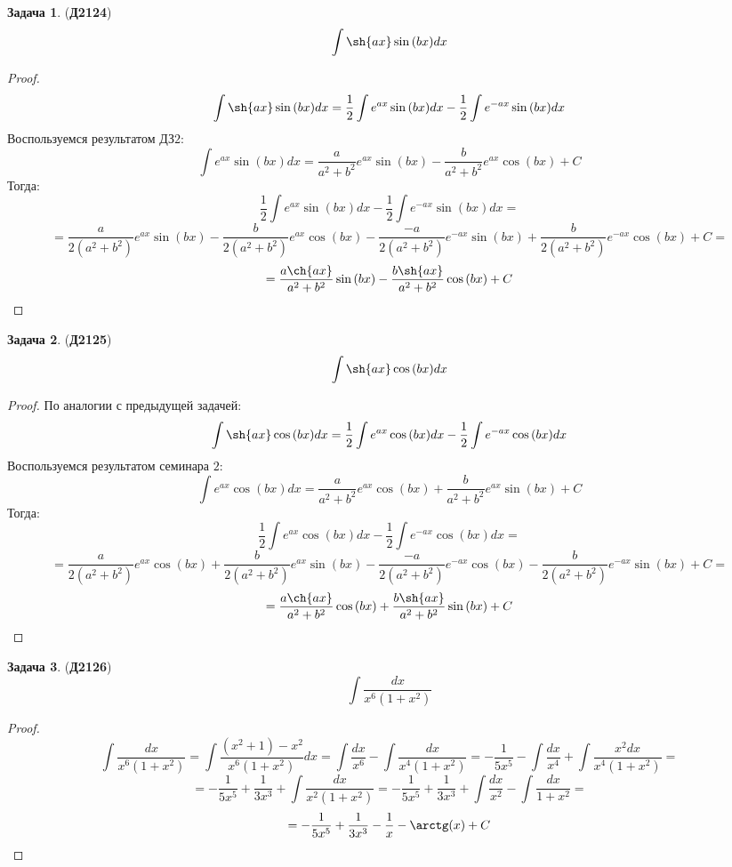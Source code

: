 \documentclass[12pt]{article}
\theoremstyle{definition}
\newtheorem{problem}{Задача}
\DeclareMathOperator{\dint}{\displaystyle\int}
\begin{document}
\begin{problem}(\textbf{Д2124})
	$$
		\dint \sh{ax}\sin{(bx)}dx
	$$
\end{problem}
\begin{proof}
	$$
		\dint \sh{ax}\sin{(bx)}dx = \dfrac{1}{2}\dint e^{ax}\sin{(bx)}dx - \dfrac{1}{2}\dint e^{-ax}\sin{(bx)}dx 
	$$
	Воспользуемся результатом ДЗ$2$:
	$$
		\dint e^{a x}\sin{(bx)}dx = \dfrac{a}{a^2 + b^2}e^{a x}\sin{(bx)} - \dfrac{b}{a^2 + b^2}e^{a x}\cos{(bx)} + C
	$$
	Тогда:
	$$
		\dfrac{1}{2}\dint e^{ax}\sin{(bx)}dx - \dfrac{1}{2}\dint e^{-ax}\sin{(bx)}dx  = 
	$$
	$$	
		= \dfrac{a}{2(a^2 + b^2)}e^{a x}\sin{(bx)} - \dfrac{b}{2(a^2 + b^2)}e^{a x}\cos{(bx)} - \dfrac{-a}{2(a^2 + b^2)}e^{-a x}\sin{(bx)} + \dfrac{b}{2(a^2 + b^2)}e^{-a x}\cos{(bx)} + C =
	$$
	$$
		=\dfrac{a\ch{ax}}{a^2 + b^2}\sin{(bx)} - \dfrac{b\sh{ax}}{a^2 + b^2}\cos{(bx)} + C
	$$
\end{proof}
\newpage
\begin{problem}(\textbf{Д2125})
	$$
		\dint \sh{ax}\cos{(bx)}dx
	$$
\end{problem}
\begin{proof}
	По аналогии с предыдущей задачей:
	$$
		\dint \sh{ax}\cos{(bx)}dx = \dfrac{1}{2}\dint e^{ax}\cos{(bx)}dx - \dfrac{1}{2}\dint e^{-ax}\cos{(bx)}dx 
	$$
	Воспользуемся результатом семинара $2$:
	$$
		\dint e^{a x}\cos{(bx)}dx = \dfrac{a}{a^2 + b^2}e^{a x}\cos{(bx)} + \dfrac{b}{a^2 + b^2}e^{a x}\sin{(bx)} + C
	$$
	Тогда:
	$$
		\dfrac{1}{2}\dint e^{ax}\cos{(bx)}dx - \dfrac{1}{2}\dint e^{-ax}\cos{(bx)}dx  = 
	$$
	$$	
		= \dfrac{a}{2(a^2 + b^2)}e^{a x}\cos{(bx)} + \dfrac{b}{2(a^2 + b^2)}e^{a x}\sin{(bx)} - \dfrac{-a}{2(a^2 + b^2)}e^{-a x}\cos{(bx)} - \dfrac{b}{2(a^2 + b^2)}e^{-a x}\sin{(bx)} + C =
	$$
	$$
		=\dfrac{a\ch{ax}}{a^2 + b^2}\cos{(bx)} + \dfrac{b\sh{ax}}{a^2 + b^2}\sin{(bx)} + C
	$$
\end{proof}


\begin{problem}(\textbf{Д2126})
	$$
		\dint \dfrac{dx}{x^6(1 +x^2)}
	$$
\end{problem}
\begin{proof}
	$$
		\dint \dfrac{dx}{x^6(1 +x^2)} = \dint \dfrac{(x^2 + 1) - x^2}{x^6(1 + x^2)}dx = \dint \dfrac{dx}{x^6} - \dint \dfrac{dx}{x^4(1 + x^2)} = -\dfrac{1}{5x^5} - \dint \dfrac{dx}{x^4} + \dint\dfrac{x^2dx}{x^4(1  + x^2)} =
	$$
	$$
		= -\dfrac{1}{5x^5} + \dfrac{1}{3x^3} + \dint\dfrac{dx}{x^2(1 + x^2)} = -\dfrac{1}{5x^5} + \dfrac{1}{3x^3} + \dint\dfrac{dx}{x^2} - \dint\dfrac{dx}{ 1 + x^2} = 
	$$
	$$
		= -\dfrac{1}{5x^5} + \dfrac{1}{3x^3} - \dfrac{1}{x} - \arctg(x) + C
	$$
\end{proof}
\end{document}
